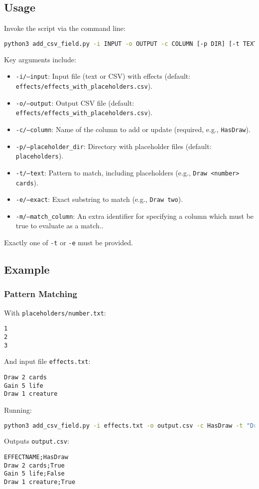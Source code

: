 \subsection{Usage}
Invoke the script via the command line:
\begin{lstlisting}[language=bash]
python3 add_csv_field.py -i INPUT -o OUTPUT -c COLUMN [-p DIR] [-t TEXT | -e EXACT] [-m MATCH\_COLUMN]
\end{lstlisting}
Key arguments include:
\begin{itemize}
    \item \texttt{-i/--input}: Input file (text or CSV) with effects (default: \texttt{effects/effects\_with\_placeholders.csv}).
    \item \texttt{-o/--output}: Output CSV file (default: \texttt{effects/effects\_with\_placeholders.csv}).
    \item \texttt{-c/--column}: Name of the column to add or update (required, e.g., \texttt{HasDraw}).
    \item \texttt{-p/--placeholder\_dir}: Directory with placeholder files (default: \texttt{placeholders}).
    \item \texttt{-t/--text}: Pattern to match, including placeholders (e.g., \texttt{Draw <number> cards}).
    \item \texttt{-e/--exact}: Exact substring to match (e.g., \texttt{Draw two}).
    \item \texttt{-m/--match\_column}: An extra identifier for specifying a column which must be true to evaluate as a match..
\end{itemize} 
Exactly one of \texttt{-t} or \texttt{-e} must be provided.

\subsection{Example}
\subsubsection{Pattern Matching}
With \texttt{placeholders/number.txt}:
\begin{lstlisting}
1
2
3
\end{lstlisting}
And input file \texttt{effects.txt}:
\begin{lstlisting}
Draw 2 cards
Gain 5 life
Draw 1 creature
\end{lstlisting}
Running:
\begin{lstlisting}[language=bash]
python3 add_csv_field.py -i effects.txt -o output.csv -c HasDraw -t "Draw <number>"
\end{lstlisting}
Outputs \texttt{output.csv}:
\begin{lstlisting}
EFFECTNAME;HasDraw
Draw 2 cards;True
Gain 5 life;False
Draw 1 creature;True
\end{lstlisting}

